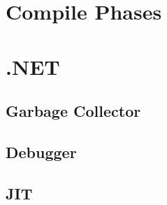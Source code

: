 \makeatletter {}\makeatother
{}

\section{Compile Phases}

\section{.NET}
\subsection{Garbage Collector}
\subsection{Debugger}
\subsection{JIT}
\worksheetend